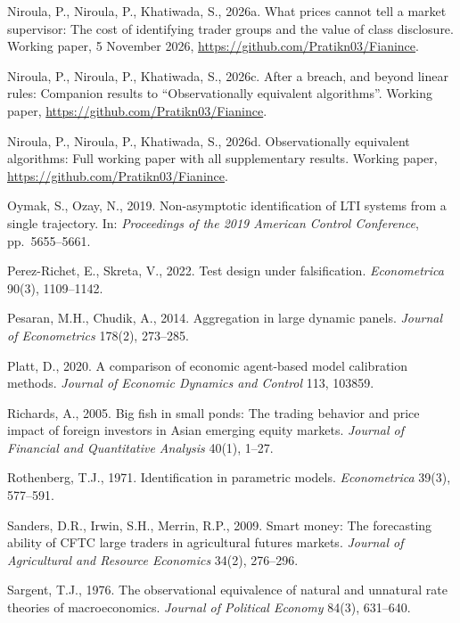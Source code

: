 \documentclass[11pt,letterpaper]{article}
\theoremstyle{definition}
\begin{document}
\begin{list}{}{\footnotesize\linespread{0.89}\selectfont\setlength{\leftmargin}{1.3em}\setlength{\itemindent}{-1.8em}\setlength{\itemsep}{0pt}\setlength{\parsep}{0pt}}
\item Niroula, P., Niroula, P., Khatiwada, S., 2026a. What prices cannot tell a market supervisor: The cost of identifying trader groups and the value of class disclosure. Working paper, 5 November 2026, \url{https://github.com/Pratikn03/Fianince}.

\item Niroula, P., Niroula, P., Khatiwada, S., 2026c. After a breach, and beyond linear rules: Companion results to ``Observationally equivalent algorithms''. Working paper, \url{https://github.com/Pratikn03/Fianince}.

\item Niroula, P., Niroula, P., Khatiwada, S., 2026d. Observationally equivalent algorithms: Full working paper with all supplementary results. Working paper, \url{https://github.com/Pratikn03/Fianince}.

\item Oymak, S., Ozay, N., 2019. Non-asymptotic identification of LTI systems from a single trajectory. In: \emph{Proceedings of the 2019 American Control Conference}, pp.\ 5655--5661.

\item Perez-Richet, E., Skreta, V., 2022. Test design under falsification. \emph{Econometrica} 90(3), 1109--1142.

\item Pesaran, M.H., Chudik, A., 2014. Aggregation in large dynamic panels. \emph{Journal of Econometrics} 178(2), 273--285.

\item Platt, D., 2020. A comparison of economic agent-based model calibration methods. \emph{Journal of Economic Dynamics and Control} 113, 103859.

\item Richards, A., 2005. Big fish in small ponds: The trading behavior and price impact of foreign investors in Asian emerging equity markets. \emph{Journal of Financial and Quantitative Analysis} 40(1), 1--27.

\item Rothenberg, T.J., 1971. Identification in parametric models. \emph{Econometrica} 39(3), 577--591.

\item Sanders, D.R., Irwin, S.H., Merrin, R.P., 2009. Smart money: The forecasting ability of CFTC large traders in agricultural futures markets. \emph{Journal of Agricultural and Resource Economics} 34(2), 276--296.

\item Sargent, T.J., 1976. The observational equivalence of natural and unnatural rate theories of macroeconomics. \emph{Journal of Political Economy} 84(3), 631--640.


\end{list}
\end{document}
